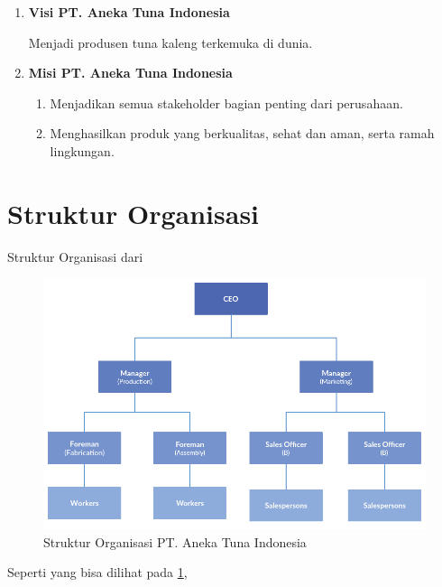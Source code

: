 \begin{enumerate}[nolistsep]

  \item \textbf{Visi PT. Aneka Tuna Indonesia}
  \vspace{0.5ex}

  Menjadi produsen tuna kaleng terkemuka di dunia.
  \vspace{0.5ex}

  \item \textbf{Misi PT. Aneka Tuna Indonesia}
  \vspace{0.5ex}

  \begin{enumerate}[nolistsep]

    \item Menjadikan semua stakeholder bagian penting dari perusahaan.
    \vspace{0.5ex}

    \item Menghasilkan produk yang berkualitas, sehat dan aman, serta ramah lingkungan.
    \vspace{0.5ex}

  \end{enumerate}
  \vspace{0.5ex}

\end{enumerate}
\vspace{0.5ex}

\section{Struktur Organisasi}
\vspace{1ex}

Struktur Organisasi dari \lipsum[1]
\vspace{0.5ex}

\begin{figure} [ht] \centering
  \includegraphics[scale=0.45]{gambar/struktur-organisasi.png}
  \caption{Struktur Organisasi PT. Aneka Tuna Indonesia}
	\label{fig:strukturOrganisasi}
\end{figure}

Seperti yang bisa dilihat pada \ref{fig:strukturOrganisasi}, \lipsum[1]
\vspace{0.5ex}
